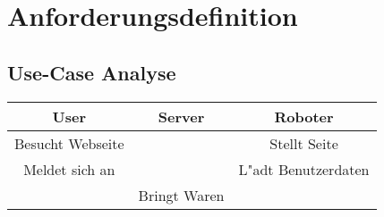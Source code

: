 %
%
\chapter{Anforderungsdefinition} \label{Kap:2}


\section{Use-Case Analyse}



\begin{center}
\begin{tabular}{ c | c | c  } 
 User & Server & Roboter \\ [0.5ex] 
\hline \hline
Besucht Webseite &  & Stellt Seite\\ 
\hline
Meldet sich an & & L"adt Benutzerdaten \\ 
\hline
& Bringt Waren & \\
\hline \hline

\end{tabular}
\end{center}

